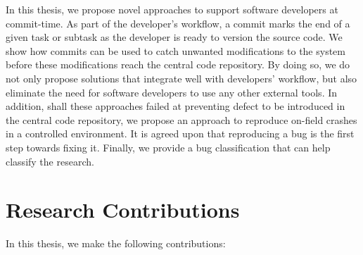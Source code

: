 \documentclass[12pt]{report}
\begin{document}
In this thesis, we propose novel approaches to support software
developers at commit-time. As part of the developer's workflow, a commit
marks the end of a given task or subtask as the developer is ready to
version the source code. We show how commits can be used to catch
unwanted modifications to the system before these modifications reach
the central code repository. By doing so, we do not only propose
solutions that integrate well with developers' workflow, but also
eliminate the need for software developers to use any other external
tools. In addition, shall these approaches failed at preventing defect
to be introduced in the central code repository, we propose an approach
to reproduce on-field crashes in a controlled environment. It is agreed
upon that reproducing a bug is the first step towards fixing it.
Finally, we provide a bug classification that can help classify the
research.

\section{Research Contributions}\label{research-contributions}

In this thesis, we make the following contributions:
\end{document}
